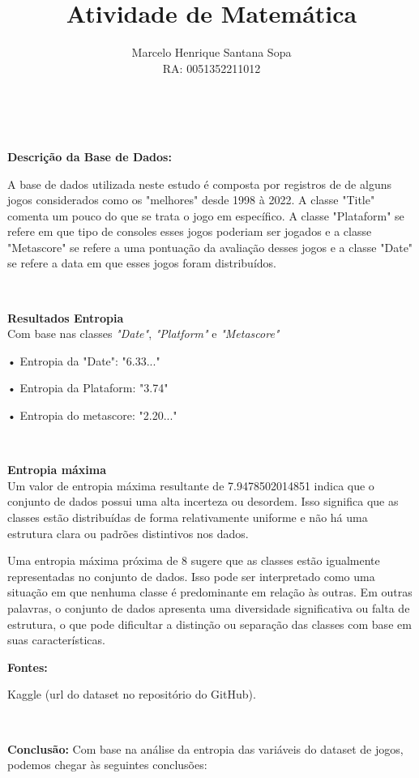 \documentclass[a4paper,12pt]{article}
\begin{document}
\title{Atividade de Matemática}
\date{}
\author{Marcelo Henrique Santana Sopa\\
RA: 0051352211012}
\maketitle

\[\]\

\textbf{Descrição da Base de Dados:}


A base de dados utilizada neste estudo é composta por registros de de alguns jogos considerados como os "melhores" desde 1998 à 2022. A classe "Title" comenta um pouco do que se trata o jogo em específico. A classe "Plataform" se refere em que tipo de consoles esses jogos poderiam ser jogados e a classe "Metascore" se refere a uma pontuação da avaliação desses jogos e a classe "Date" se refere a data em que esses jogos foram distribuídos.

\[\]\

\textbf{Resultados Entropia}\\
Com base nas classes \textit{"Date"}, \textit{"Platform"} e \textit{"Metascore"}

• Entropia da "Date": "6.33..."

• Entropia da Plataform: "3.74"

• Entropia do metascore: "2.20..."

\[\]\

\textbf{Entropia máxima}\\
Um valor de entropia máxima resultante de 7.9478502014851 indica que o conjunto de dados possui uma alta incerteza ou desordem. Isso significa que as classes estão distribuídas de forma relativamente uniforme e não há uma estrutura clara ou padrões distintivos nos dados.

Uma entropia máxima próxima de 8 sugere que as classes estão igualmente representadas no conjunto de dados. Isso pode ser interpretado como uma situação em que nenhuma classe é predominante em relação às outras. Em outras palavras, o conjunto de dados apresenta uma diversidade significativa ou falta de estrutura, o que pode dificultar a distinção ou separação das classes com base em suas características.

\newpage

\textbf{Fontes:}

Kaggle (url do dataset no repositório do GitHub).

\[\]\

\textbf{Conclusão:}
Com base na análise da entropia das variáveis do dataset de jogos, podemos chegar às seguintes conclusões:
\end{document}
